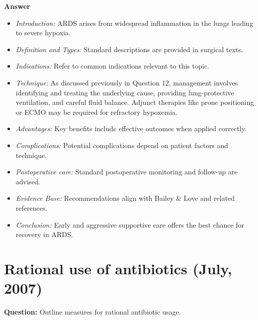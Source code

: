 \documentclass{article}
\begin{document}
\textbf{Answer}
\begin{itemize}

\item \emph{Introduction:} ARDS arises from widespread inflammation in the lungs leading to severe hypoxia.
\item \emph{Definition and Types:} Standard descriptions are provided in surgical texts.
\item \emph{Indications:} Refer to common indications relevant to this topic.

\item \emph{Technique:} As discussed previously in Question 12, management involves identifying and treating the underlying cause, providing lung-protective ventilation, and careful fluid balance. Adjunct therapies like prone positioning or ECMO may be required for refractory hypoxemia.
\item \emph{Advantages:} Key benefits include effective outcomes when applied correctly.
\item \emph{Complications:} Potential complications depend on patient factors and technique.
\item \emph{Postoperative care:} Standard postoperative monitoring and follow-up are advised.
\item \emph{Evidence Base:} Recommendations align with Bailey \& Love and related references.

\item \emph{Conclusion:} Early and aggressive supportive care offers the best chance for recovery in ARDS.


\end{itemize}

\section{Rational use of antibiotics (July, 2007)}

\textbf{Question:} Outline measures for rational antibiotic usage.
\end{document}
